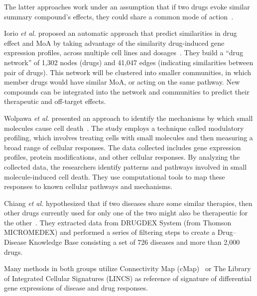 \documentclass[Minh_PhD_thesis.tex]{subfiles}
\begin{document}
The latter approaches work under an assumption that if two drugs evoke similar summary compound's effects, they could share a common mode of action~\cite{iorio2010identification, iorio2010discovery, wolpaw2011modulatory,  chiang2009systematic}. 

Iorio \textit{et al.} proposed an automatic approach that predict similarities in drug effect and MoA by taking advantage of the similarity drug-induced gene expression profiles, across multiple cell lines and dosages~\cite{iorio2010identification, iorio2010discovery}.
They build a “drug network” of 1,302 nodes (drugs) and 41,047 edges (indicating similarities between pair of drugs). This network will be clustered into smaller communities, in which member drugs would have similar MoA, or acting on the same pathway. New compounds can be integrated into the network and communities to predict their therapeutic and off-target effects.

Wolpawa \textit{et al.} presented an approach to identify the mechanisms by which small molecules cause cell death~\cite{wolpaw2011modulatory}. The study employs a technique called modulatory profiling, which involves treating cells with small molecules and then measuring a broad range of cellular responses. The data collected includes gene expression profiles, protein modifications, and other cellular responses. By analyzing the collected data, the researchers identify patterns and pathways involved in small molecule-induced cell death. They use computational tools to map these responses to known cellular pathways and mechanisms.

Chiang \textit{et al.} hypothesized that if two diseases share some similar therapies, then other drugs currently used for only one of the two might also be therapeutic for the other~\cite{chiang2009systematic}. They extracted data from DRUGDEX System (from Thomson MICROMEDEX) and performed a series of filtering steps to create a Drug–Disease Knowledge Base consisting a set of 726 diseases and more than 2,000 drugs.

Many methods in both groups utilize Connectivity Map (cMap)~\cite{lamb2007connectivity, lamb2006connectivity} or The Library of Integrated Cellular Signatures (LINCS) as reference of signature of differential gene expressions of disease and drug responses. 
\end{document}
